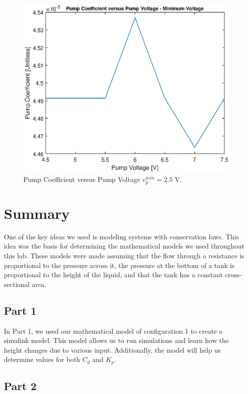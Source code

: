 \documentclass[12pt]{article}
\numberwithin{equation}{section}
\begin{document}
  \begin{figure}
    \includegraphics[width=\textwidth]{figures/figure3}
    \caption{Pump Coefficient versus Pump Voltage $ v_p^{min} = 2.5 \text{ V}. $}
    \label{fig:fig3}
  \end{figure}

  \newpage

  \section{Summary}

  One of the key ideas we used is modeling systems with conservation laws. This idea was the basis for determining the mathematical models we used throughout this lab. These models were made assuming that the flow through a resistance is proportional to the pressure across it, the pressure at the bottom of a tank is proportional to the height of the liquid, and that the tank has a constant cross-sectional area.

  \subsection{Part 1}

  In Part 1, we used our mathematical model of configuration 1 to create a simulink model. This model allows us to run simulations and learn how the height changes due to various input. Additionally, the model will help us determine values for both $ C_d $ and $ K_p. $

  \subsection{Part 2}
\end{document}
